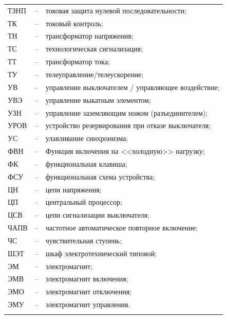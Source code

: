 \begin{longtable}{>{\raggedright\arraybackslash}m{2cm}>{\raggedright\arraybackslash}m{0.5cm}>{\raggedright\arraybackslash}m{20cm}}
ТЗНП & -- & токовая защита нулевой последовательности; \\
ТК & -- & токовый контроль; \\
ТН & -- & трансформатор напряжения; \\
ТС & -- & технологическая сигнализация; \\
ТТ & -- & трансформатор тока; \\
ТУ & -- & телеуправление/телеускорение; \\
УВ & -- & управление выключателем / управляющее воздействие; \\
УВЭ & -- & управление выкатным элементом; \\
УЗН & -- & управление заземляющим ножом (разъединителем); \\
УРОВ & -- & устройство резервирования при отказе выключателя; \\
УС & -- & улавливание синхронизма; \\
ФВН & -- & Функция включения на <<холодную>> нагрузку; \\
ФК & -- & функциональная клавиша; \\
ФСУ & -- & функциональная схема устройства; \\
ЦН & -- & цепи напряжения; \\
ЦП & -- & центральный процессор; \\
ЦСВ & -- & цепи сигнализации выключателя; \\
ЧАПВ & -- & частотное автоматическое повторное включение; \\
ЧС & -- & чувствительная ступень; \\
ШЭТ & -- & шкаф электротехнический типовой; \\
ЭМ & -- & электромагнит; \\
ЭМВ & -- & электромагнит включения; \\
ЭМО & -- & электромагнит отключения; \\
ЭМУ & -- & электромагнит управления. \\
{\color{white}\fontsize{0.1pt}{0.1pt}\selectfont<endABBRS>}
\end{longtable}
